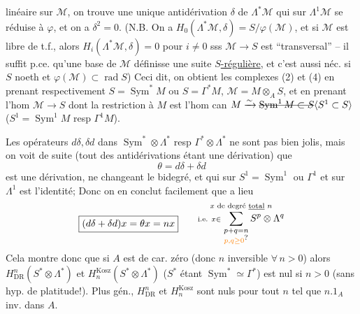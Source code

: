linéaire sur $\mathcal M$, on trouve une unique antidérivation $\delta$ de $\Lambda^*\mathcal M$ qui sur $\Lambda^1\mathcal M$ se réduise à $\varphi$, et on a $\delta^2=0$. (N.B. On a $H_0(\Lambda^*\mathcal M,\delta)=S/\varphi(\mathcal M)$, et si $\mathcal M$ est libre de t.f., alors $H_i(\Lambda^*\mathcal M,\delta)=0$ pour $i\ne0$ sss $\mathcal M\longrightarrow S$ est ``transversal'' -- il suffit p.ce. qu'une base  de $\mathcal M$ définisse une suite \uline{$S$-régulière}, et c'est aussi néc. si $S$ noeth et  $\varphi(\mathcal M)\subset\operatorname{rad} S$)
Ceci dit, on obtient les complexes (2) et (4) en prenant respectivement $S=\operatorname{Sym}^* M$ ou $S=\Gamma^*M$, $\mathcal M=M\otimes_A S$, et en prenant l'hom $\mathcal M\to S$  dont la restriction à $M$ est l'hom can $M\xrightarrow{\sim}\deleted{\operatorname{Sym}^1M\subset S}\inserted{S^1\subset S}$  ($S^1=\operatorname{Sym}^1 M$ resp $\Gamma^1 M$).

Les opérateurs $d\delta,\delta d$ dans $\operatorname{Sym}^*\otimes\Lambda^*$ resp $\Gamma^*\otimes\Lambda^*$ ne sont pas bien jolis, mais on voit de suite (tout  des antidérivations étant une dérivation) que
\[
 \theta=d\delta+\delta d
\]
est une dérivation,   ne changeant  le bidegré, et qui sur  $S^1=\operatorname{Sym}^1$ ou $\Gamma^1$ et sur $\Lambda^1$ est l'identité;  Donc on en conclut facilement que a lieu
\[
 \boxed{(d\delta+\delta d)x=\theta x=nx}\qquad
 \substack{x\text{ de degré }\underline{\text{total}}\text{ }n\\ \text{i.e. }x\in\displaystyle\sum_{\substack{p+q=n\\\unsure{p,q\geq0}}}S^p\otimes\Lambda^q}
\]
Cela montre donc que si $A$ est de car. zéro (donc $n$ inversible $\forall\,n>0$) alors $H^{n}_{\mathrm{DR}}(S^*\otimes\Lambda^*)$ et $H^{\mathrm{Kosz}}_{n}(S^*\otimes\Lambda^*)$ ($S^*$ étant $\operatorname{Sym}^*\simeq\Gamma^*$) est nul si  $n>0$ (sans hyp. de platitude!). Plus gén., $H^n_{\mathrm{DR}}$ et $H_n^{\mathrm{Kosz}}$ sont nuls pour tout $n$ tel que $n.1_A$ inv. dans $A$.
\margin{$\Vert$}


